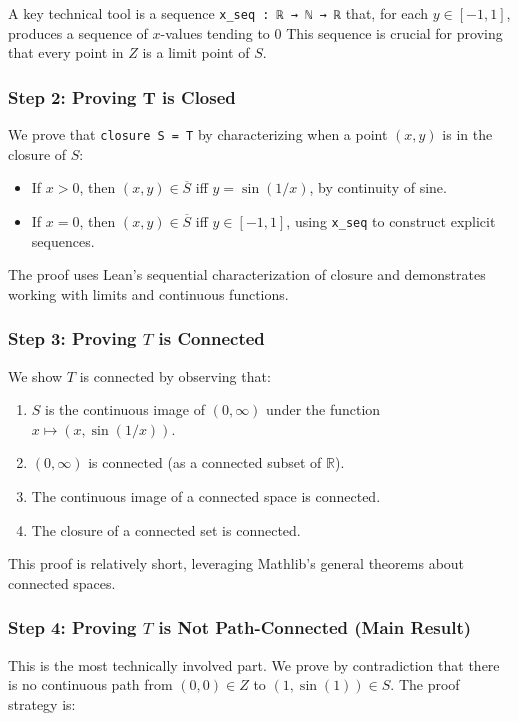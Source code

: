 A key technical tool is a sequence \lstinline[language=lean]|x_seq : ℝ → ℕ → ℝ| that,
for each $y \in [-1, 1]$, produces a sequence of $x$-values tending to $0$
This sequence is crucial for proving that every point in $Z$ is a limit point of $S$.
\subsubsection{Step 2: Proving T is Closed}
We prove that \lstinline[language=lean]|closure S = T| by characterizing when
a point $(x, y)$ is in the closure of $S$:
\begin{itemize}
  \item If $x > 0$, then $(x, y) \in \overline{S}$ iff $y = \sin(1/x)$, by continuity of sine.
  \item If $x = 0$, then $(x, y) \in \overline{S}$ iff $y \in [-1, 1]$, using \lstinline[language=lean]|x_seq| to construct explicit sequences.
\end{itemize}
The proof uses Lean's sequential characterization of closure and demonstrates working
with limits and continuous functions.
\subsubsection{Step 3: Proving $T$ is Connected}

We show $T$ is connected by observing that:
\begin{enumerate}
  \item $S$ is the continuous image of $(0, \infty)$ under the function $x \mapsto (x, \sin(1/x))$.
  \item $(0, \infty)$ is connected (as a connected subset of $\mathbb{R}$).
  \item The continuous image of a connected space is connected.
  \item The closure of a connected set is connected.
\end{enumerate}

This proof is relatively short, leveraging Mathlib's general theorems about connected spaces.

\subsubsection{Step 4: Proving $T$ is Not Path-Connected (Main Result)}

This is the most technically involved part. We prove by contradiction that there is no continuous path from $(0, 0) \in Z$ to $(1, \sin(1)) \in S$. The proof strategy is:

